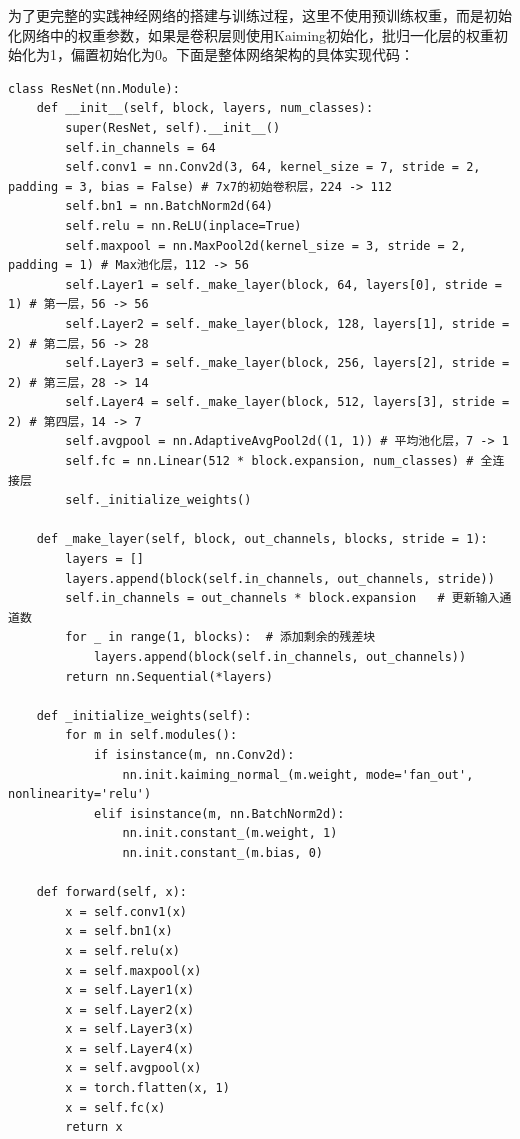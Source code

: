 \documentclass[11pt]{article}
\begin{document}
	为了更完整的实践神经网络的搭建与训练过程，这里不使用预训练权重，而是初始化网络中的权重参数，如果是卷积层则使用Kaiming初始化，批归一化层的权重初始化为1，偏置初始化为0。下面是整体网络架构的具体实现代码：
	\begin{lstlisting}
class ResNet(nn.Module):
    def __init__(self, block, layers, num_classes):
        super(ResNet, self).__init__()
        self.in_channels = 64
        self.conv1 = nn.Conv2d(3, 64, kernel_size = 7, stride = 2, padding = 3, bias = False) # 7x7的初始卷积层，224 -> 112
        self.bn1 = nn.BatchNorm2d(64)
        self.relu = nn.ReLU(inplace=True)
        self.maxpool = nn.MaxPool2d(kernel_size = 3, stride = 2, padding = 1) # Max池化层，112 -> 56
        self.Layer1 = self._make_layer(block, 64, layers[0], stride = 1) # 第一层，56 -> 56
        self.Layer2 = self._make_layer(block, 128, layers[1], stride = 2) # 第二层，56 -> 28
        self.Layer3 = self._make_layer(block, 256, layers[2], stride = 2) # 第三层，28 -> 14
        self.Layer4 = self._make_layer(block, 512, layers[3], stride = 2) # 第四层，14 -> 7
        self.avgpool = nn.AdaptiveAvgPool2d((1, 1)) # 平均池化层，7 -> 1
        self.fc = nn.Linear(512 * block.expansion, num_classes) # 全连接层
        self._initialize_weights()
    
    def _make_layer(self, block, out_channels, blocks, stride = 1):
        layers = []
        layers.append(block(self.in_channels, out_channels, stride))
        self.in_channels = out_channels * block.expansion   # 更新输入通道数
        for _ in range(1, blocks):  # 添加剩余的残差块
            layers.append(block(self.in_channels, out_channels))
        return nn.Sequential(*layers)
    
    def _initialize_weights(self):
        for m in self.modules():
            if isinstance(m, nn.Conv2d):
                nn.init.kaiming_normal_(m.weight, mode='fan_out', nonlinearity='relu')
            elif isinstance(m, nn.BatchNorm2d):
                nn.init.constant_(m.weight, 1)
                nn.init.constant_(m.bias, 0)
        
    def forward(self, x):
        x = self.conv1(x)
        x = self.bn1(x)
        x = self.relu(x)
        x = self.maxpool(x)
        x = self.Layer1(x)
        x = self.Layer2(x)
        x = self.Layer3(x)
        x = self.Layer4(x)
        x = self.avgpool(x)
        x = torch.flatten(x, 1)
        x = self.fc(x)
        return x
	\end{lstlisting}
\end{document}
